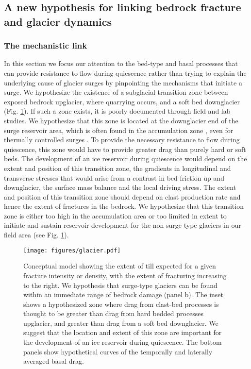 \documentclass[draft,linenumbers]{agujournal}
\begin{document}
\subsection{A new hypothesis for linking bedrock fracture and glacier dynamics}


\subsubsection{The mechanistic link}

In this section we focus our attention to the bed-type and basal processes that can provide resistance to flow during quiescence rather than trying to explain the underlying cause of glacier surges by pinpointing the mechanisms that initiate a surge. We hypothesize the existence of a subglacial transition zone between exposed bedrock upglacier, where quarrying occurs, and a soft bed downglacier (Fig. \ref{gl}). If such a zone exists, it is poorly documented through field and lab studies. We hypothesize that this zone is located at the downglacier end of the surge reservoir area, which is often found in the accumulation zone \citep[e.g.][]{Kamb1985,Stanley1969}, even for thermally controlled surges \citep[e.g][]{Sevestre2015a,Sund2014}. To provide the necessary resistance to flow during quiescence, this zone would have to provide greater drag than purely hard or soft beds. The development of an ice reservoir during quiescence would depend on the extent and position of this transition zone, the gradients in longitudinal and transverse stresses that would arise from a contrast in bed friction up and downglacier, the surface mass balance and the local driving stress. The extent and position of this transition zone should depend on clast production rate and hence the extent of fractures in the bedrock. We hypothesize that this transition zone is either too high in the accumulation area or too limited in extent to initiate and sustain reservoir development for the non-surge type glaciers in our field area (see Fig. \ref{gl}). 

\begin{figure}[H]
  \centering
  \texttt{[image: figures/glacier.pdf]}
  \caption[]{Conceptual model showing the extent of till expected for a given fracture intensity or density, with the extent of fracturing increasing to the right. We hypothesis that surge-type glaciers can be found within an immediate range of bedrock damage (panel b). The inset shows a hypothesized zone where drag from clast-bed processes is thought to be greater than drag from hard bedded processes upglacier, and greater than drag from a soft bed downglacier. We suggest that the location and extent of this zone are important for the development of an ice reservoir during quiescence. The bottom panels show hypothetical curves of the temporally and laterally averaged basal drag.}
\label{gl}
\end{figure}
\end{document}
